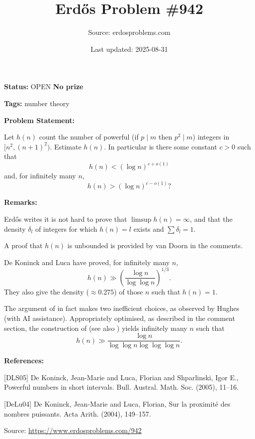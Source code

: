 \documentclass{article}
\title{Erd\H{o}s Problem \#942}
\date{Last updated: 2025-08-31}
\author{Source: erdosproblems.com}
\begin{document}
\maketitle

\noindent\textbf{Status:} OPEN \quad \textbf{No prize}

\noindent\textbf{Tags:} number theory

\medskip
\noindent\textbf{Problem Statement:}

Let $h(n)$ count the number of powerful (if $p\mid m$ then $p^2\mid m$) integers in $[n^2,(n+1)^2)$. Estimate $h(n)$. In particular is there some constant $c>0$ such that\[h(n) < (\log n)^{c+o(1)}\]and, for infinitely many $n$,\[h(n) >(\log n)^{c-o(1)}?\]

\bigskip
\noindent\textbf{Remarks:}

Erd\H{o}s writes it is not hard to prove that $\limsup h(n)=\infty$, and that the density $\delta_l$ of integers for which $h(n)=l$ exists and $\sum \delta_l=1$. 

A proof that $h(n)$ is unbounded is provided by van Doorn in the comments.

De Koninck and Luca \cite{DeLu04} have proved, for infinitely many $n$,\[h(n) \gg \left(\frac{\log n}{\log\log n}\right)^{1/3}.\]They also give the density ($\approx 0.275$) of those $n$ such that $h(n)=1$.

The argument of \cite{DeLu04} in fact makes two inefficient choices, as observed by Hughes (with AI assistance). Appropriately optimised, as described in the comment section, the construction of \cite{DeLu04} (see also \cite{DLS05}) yields infinitely many $n$ such that\[h(n) \gg \frac{\log n}{\log\log n\log\log\log n}.\]

\bigskip
\noindent\textbf{References:}

[DLS05] De Koninck, Jean-Marie and Luca, Florian and Shparlinski, Igor
E., Powerful numbers in short intervals. Bull. Austral. Math. Soc. (2005), 11--16.
 
 [DeLu04] De Koninck, Jean-Marie and Luca, Florian, Sur la proximit\'{e} des nombres puissants. Acta Arith. (2004), 149--157.

\bigskip
\noindent\small{Source: \url{https://www.erdosproblems.com/942}}
\end{document}
